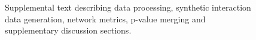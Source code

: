 \documentclass[letterpaper,12pt]{article}
\begin{document}
  \setcounter{figure}{0}
  \renewcommand{\figurename}{Text}
  \renewcommand{\thefigure}{S\arabic{figure}}
  \begin{figure}[H]
    \centering
    \caption{Supplemental text describing data processing, synthetic interaction data generation, network metrics, p-value merging and supplementary discussion sections.}
    \label{txt:text_s1}
  \end{figure}

% 

\end{document}
